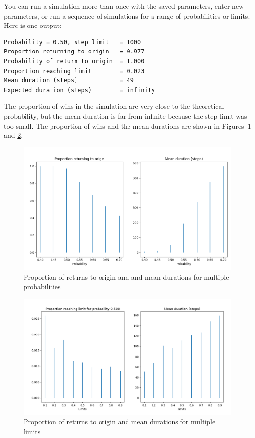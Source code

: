 \documentclass[11pt,a4paper]{article}
\begin{document}
You can run a simulation more than once with the saved parameters, enter new parameters, or run a sequence of simulations for a range of probabilities or limits. Here is one output:
\begin{verbatim}
Probability = 0.50, step limit   = 1000
Proportion returning to origin   = 0.977
Probability of return to origin  = 1.000
Proportion reaching limit        = 0.023
Mean duration (steps)            = 49
Expected duration (steps)        = infinity
\end{verbatim}
The proportion of wins in the simulation are very close to the theoretical probability, but the mean duration is far from infinite because the step limit was too small.  The proportion of wins and the mean durations are shown in Figures~\ref{f.random-walk-01} and \ref{f.random-walk-02}.
\begin{figure}
\begin{center}
\includegraphics[width=\textwidth]{random-walk-01}
\caption{Proportion of returns to origin and and mean durations for multiple probabilities}\label{f.random-walk-01}
\end{center}
\end{figure}
\begin{figure}
\begin{center}
\includegraphics[width=\textwidth]{random-walk-02}
\caption{Proportion of returns to origin and mean durations for multiple limits}\label{f.random-walk-02}
\end{center}
\end{figure}
\end{document}

